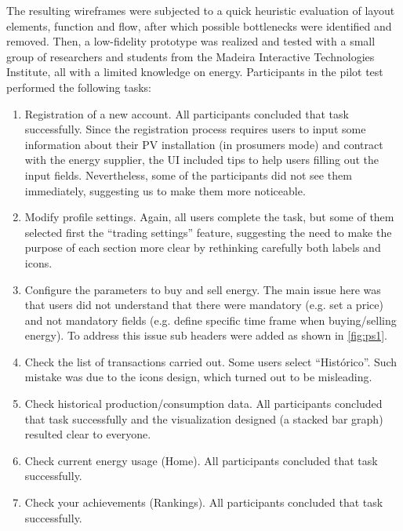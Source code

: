The resulting wireframes were subjected to a quick heuristic evaluation of layout elements, function and flow, after which possible bottlenecks were identified and removed. Then, a low-fidelity prototype was realized and tested with a small group of researchers and students from the Madeira Interactive Technologies Institute, all with a limited knowledge on energy.
Participants in the pilot test performed the following tasks:
\begin{enumerate}
    \item Registration of a new account. All participants concluded that task successfully. Since the registration process requires users to input some information about their \ac{PV} installation (in prosumers mode) and contract with the energy supplier, the \ac{UI} included tips to help users filling out the input fields. Nevertheless, some of the participants did not see them immediately, suggesting us to make them more noticeable. 
    \item Modify profile settings. Again, all users complete the task, but some of them selected first the “trading settings” feature, suggesting the need to make the purpose of each section more clear by rethinking carefully both labels and icons.
    \item Configure the parameters to buy and sell energy. The main issue here was that users did not understand that there were mandatory (e.g. set a price) and not mandatory fields (e.g. define specific time frame when buying/selling energy). To address this issue sub headers were added as shown in \cref{fig:ps1}.
    \item Check the list of transactions carried out. Some users select “Histórico”. Such mistake was due to the icons design, which turned out to be misleading.
    \item Check historical production/consumption data. All participants concluded that task successfully and the visualization designed (a stacked bar graph) resulted clear to everyone.
    \item Check current energy usage (Home). All participants concluded that task successfully.
    \item Check your achievements (Rankings). All participants concluded that task successfully.
\end{enumerate}


